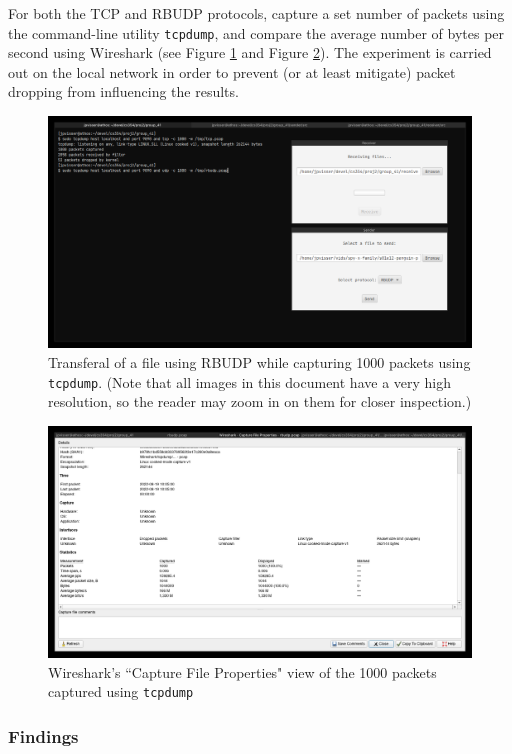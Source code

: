 \documentclass[10pt, a4paper]{article}
\begin{document}
For both the TCP and RBUDP protocols, capture a set number of packets using
the command-line utility \texttt{tcpdump}, and compare the average number of
bytes per second using Wireshark (see Figure \ref{fig:exp1-1} and Figure
\ref{fig:exp1-2}). The experiment is carried out on the local network in order
to prevent (or at least mitigate) packet dropping from influencing the results.

\begin{figure}
  \centering
  \includegraphics[width=12cm]{exp1-1}
  \caption{Transferal of a file using RBUDP while capturing 1000 packets using
  \texttt{tcpdump}. (Note that all images in this document have a very high
  resolution, so the reader may zoom in on them for closer inspection.)}
  \label{fig:exp1-1}
\end{figure}

\begin{figure}
  \centering
  \includegraphics[width=12cm]{exp1-3}
  \caption{Wireshark's ``Capture File Properties" view of the 1000 packets
  captured using \texttt{tcpdump}}
  \label{fig:exp1-2}
\end{figure}

\subsubsection{Findings}
\label{subsubsec:findings-1}
\end{document}

